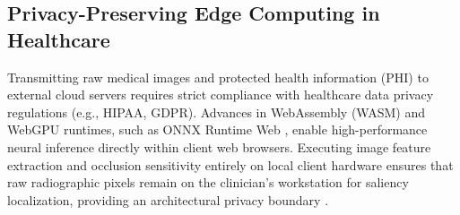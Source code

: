 \documentclass[journal,10pt,twocolumn]{IEEEtran}
\begin{document}
\subsection{Privacy-Preserving Edge Computing in Healthcare}
Transmitting raw medical images and protected health information (PHI) to external cloud servers requires strict compliance with healthcare data privacy regulations (e.g., HIPAA, GDPR). Advances in WebAssembly (WASM) and WebGPU runtimes, such as ONNX Runtime Web \cite{onnxruntime2024}, enable high-performance neural inference directly within client web browsers. Executing image feature extraction and occlusion sensitivity entirely on local client hardware ensures that raw radiographic pixels remain on the clinician's workstation for saliency localization, providing an architectural privacy boundary \cite{onnxruntime2024}.
\end{document}
